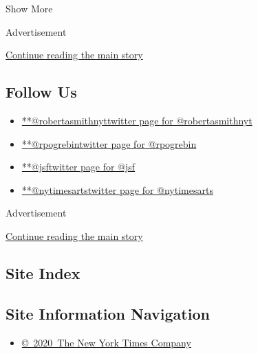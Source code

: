 Show More

Advertisement

\protect\hyperlink{after-mid2}{Continue reading the main story}

\hypertarget{follow-us}{%
\subsection{Follow Us}\label{follow-us}}

\begin{itemize}
\tightlist
\item
  \href{https://twitter.com/robertasmithnyt}{**@robertasmithnyttwitter
  page for @robertasmithnyt}
\item
  \href{https://twitter.com/rpogrebin}{**@rpogrebintwitter page for
  @rpogrebin}
\item
  \href{https://twitter.com/jsf}{**@jsftwitter page for @jsf}
\item
  \href{https://twitter.com/nytimesarts}{**@nytimesartstwitter page for
  @nytimesarts}
\end{itemize}

Advertisement

\protect\hyperlink{after-mktg}{Continue reading the main story}

\hypertarget{site-index}{%
\subsection{Site Index}\label{site-index}}

\hypertarget{site-information-navigation}{%
\subsection{Site Information
Navigation}\label{site-information-navigation}}

\begin{itemize}
\tightlist
\item
  \href{https://help.nytimes3xbfgragh.onion/hc/en-us/articles/115014792127-Copyright-notice}{©~2020~The
  New York Times Company}
\end{itemize}

